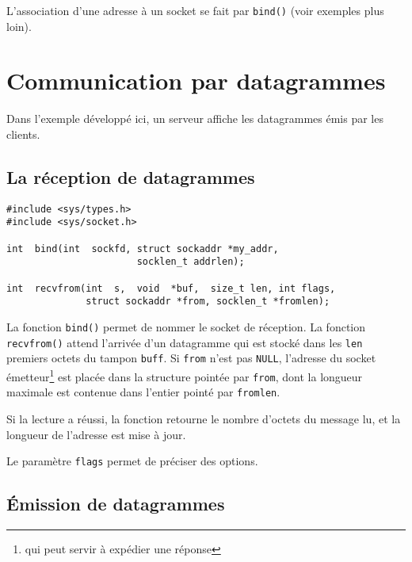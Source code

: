 
L'association d'une adresse à un socket se fait par \texttt{bind()}
(voir exemples plus loin).

\section{Communication par datagrammes}

Dans l'exemple développé ici, un serveur affiche les datagrammes
émis par les clients.

\subsection{La réception de datagrammes}


\extrait
\begin{lstlisting}
#include <sys/types.h>
#include <sys/socket.h>

int  bind(int  sockfd, struct sockaddr *my_addr, 
                       socklen_t addrlen);

int  recvfrom(int  s,  void  *buf,  size_t len, int flags,
              struct sockaddr *from, socklen_t *fromlen);

\end{lstlisting}


La fonction \texttt{bind()} permet de nommer le socket de réception.
La fonction \texttt{recvfrom()} attend l'arrivée d'un datagramme qui
est stocké dans les \texttt{len} premiers octets du tampon
\texttt{buff}.  Si \texttt{from} n'est pas \texttt{NULL}, l'adresse du
socket émetteur\footnote{qui peut servir à expédier une réponse} est
placée dans la structure pointée par \texttt{from}, dont la longueur
maximale est contenue dans l'entier pointé par \texttt{fromlen}.


Si la lecture a réussi, la fonction retourne le nombre d'octets du
message lu, et la longueur de l'adresse est mise à jour.


Le paramètre \texttt{flags} permet de préciser des options.


\source



\subsection{Émission de datagrammes}

